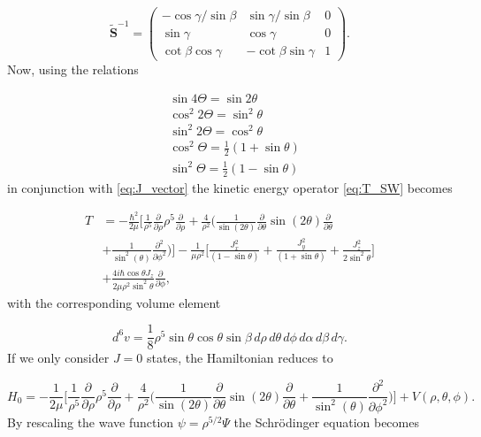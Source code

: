 \begin{equation}
\tilde{\mathbf{S}}^{-1}=
\begin{pmatrix}
-\cos\gamma/\sin\beta & \sin\gamma/\sin\beta & 0\\
\sin\gamma  & \cos\gamma & 0\\
\cot\beta \cos\gamma  & -\cot\beta \sin\gamma  & 1
\end{pmatrix}.
\end{equation}
Now, using the relations

\begin{equation}
\begin{aligned}
&\sin 4\Theta   =\sin 2\theta\\
&\cos^2 2\Theta =\sin^2 \theta\\
&\sin^2 2\Theta =\cos^2 \theta\\
&\cos^2\Theta    =\frac{1}{2}(1+\sin\theta)\\
&\sin^2\Theta    =\frac{1}{2}(1-\sin\theta)
\end{aligned}
\end{equation}
in conjunction with \eqref{eq:J_vector} the kinetic energy operator \eqref{eq:T_SW} becomes

\begin{equation}
\begin{aligned}
T &=-\frac{\hbar^2}{2\mu}\Bigg[\frac{1}{\rho^5}\frac{\partial}{\partial\rho}\rho^5\frac{\partial}{\partial\rho} + \frac{4}{\rho^2}\Bigg(\frac{1}{\sin(2\theta)}\frac{\partial}{\partial\theta}\sin(2\theta)\frac{\partial}{\partial\theta}\\
&+\frac{1}{\sin^2(\theta)}\frac{\partial^2}{\partial\phi^2} \Bigg)\Bigg]-\frac{1}{\mu\rho^2}\Bigg[\frac{J^2_x}{(1-\sin\theta)} + \frac{J^2_y}{(1+\sin\theta)} +\frac{J^2_z}{2\sin^2\theta}\Bigg]\\
&+ \frac{4i\hbar\cos\theta J_z}{2\mu\rho^2\sin^2\theta}\frac{\partial}{\partial\phi},
\end{aligned}
\end{equation}
with the corresponding volume element

\begin{equation}
d^6 v = \frac{1}{8}\rho^5 \sin\theta\cos\theta\sin\beta \, d\rho \, d\theta \, d\phi \, d\alpha \, d\beta \, d\gamma.
\end{equation}
If we only consider $J=0$ states, the Hamiltonian reduces to 

\begin{equation}
H_{0} = -\frac{1}{2 \mu} \Bigg[ \frac{1}{\rho^{5}} \frac{\partial}{\partial \rho} \rho^{5} \frac{\partial}{\partial \rho} + \frac{4}{\rho^{2}}\Big( \frac{1}{\sin(2\theta)} \frac{\partial}{\partial \theta} \sin(2\theta) \frac{\partial}{\partial \theta} + \frac{1}{\sin^{2}(\theta)} \frac{\partial^{2}}{\partial \phi^{2}} \Big) \Bigg] + V(\rho, \theta, \phi).
\end{equation}
By rescaling the wave function $\psi = \rho^{5/2} \Psi$ the Schr{\"o}dinger equation becomes


